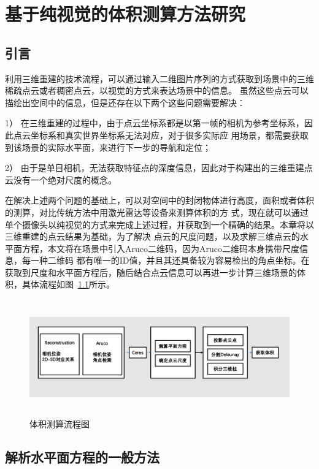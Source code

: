 \chapter{基于纯视觉的体积测算方法研究}
\label{cha:chap4}
\section{引言}
\label{sec:4.1}
利用三维重建的技术流程，可以通过输入二维图片序列的方式获取到场景中的三维稀疏点云或者稠密点云，以视觉的方式来表达场景中的信息。
虽然这些点云可以描绘出空间中的信息，但是还存在以下两个这些问题需要解决：

1）	在三维重建的过程中，由于点云坐标系都是以第一帧的相机为参考坐标系，因此点云坐标系和真实世界坐标系无法对应，对于很多实际应
用场景，都需要获取到该场景的实际水平面，来进行下一步的导航和定位；

2）	由于是单目相机，无法获取特征点的深度信息，因此对于构建出的三维重建点云没有一个绝对尺度的概念。

在解决上述两个问题的基础上，可以对空间中的封闭物体进行高度，面积或者体积的测算，对比传统方法中用激光雷达等设备来测算体积的方
式，现在就可以通过单个摄像头以纯视觉的方式来完成上述过程，并获取到一个精确的结果。本章将以三维重建的点云结果为基础，为了解决
点云的尺度问题，以及求解三维点云的水平面方程，本文将在场景中引入Aruco二维码，因为Aruco二维码本身携带尺度信息，每一种二维码
都有唯一的ID值，并且其还具备较为容易检出的角点坐标。在获取到尺度和水平面方程后，随后结合点云信息可以再进一步计算三维场景的体
积，具体流程如图~\ref{fig:getVolume}所示。

\begin{figure}[H] %
    \centering
    \includegraphics[height=5cm]{getVolume.png}
    \caption{体积测算流程图}
    \label{fig:getVolume}
  \end{figure}

\section{解析水平面方程的一般方法}
\label{sec:4.2}
